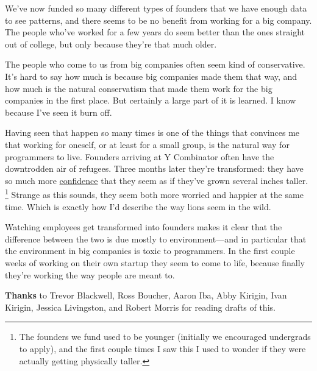 We've now funded so many different types of founders that we have enough
data to see patterns, and there seems to be no benefit from working for
a big company. The people who've worked for a few years do seem better
than the ones straight out of college, but only because they're that
much older.

The people who come to us from big companies often seem kind of
conservative. It's hard to say how much is because big companies made
them that way, and how much is the natural conservatism that made them
work for the big companies in the first place. But certainly a large
part of it is learned. I know because I've seen it burn off.

Having seen that happen so many times is one of the things that
convinces me that working for oneself, or at least for a small group, is
the natural way for programmers to live. Founders arriving at Y
Combinator often have the downtrodden air of refugees. Three months
later they're transformed: they have so much more
\href{http://paulmckellar.com/photos/03l}{confidence} that they seem as
if they've grown several inches taller. \footnote{The founders we fund used to be younger (initially we encouraged
undergrads to apply), and the first couple times I saw this I used to
wonder if they were actually getting physically taller.} Strange
as this sounds, they seem both more worried and happier at the same
time. Which is exactly how I'd describe the way lions seem in the wild.

Watching employees get transformed into founders makes it clear that the
difference between the two is due mostly to environment---and in
particular that the environment in big companies is toxic to
programmers. In the first couple weeks of working on their own startup
they seem to come to life, because finally they're working the way
people are meant to.


\textbf{Thanks} to Trevor Blackwell, Ross Boucher, Aaron Iba, Abby
Kirigin, Ivan Kirigin, Jessica Livingston, and Robert Morris for reading
drafts of this.